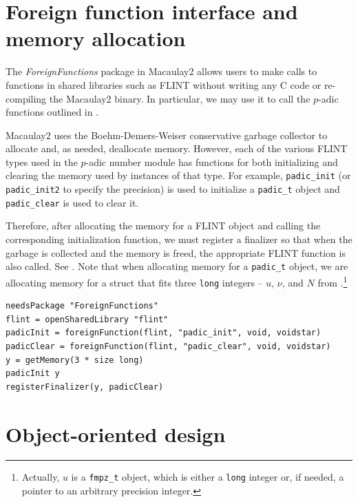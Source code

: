 \documentclass[runningheads]{llncs}
\begin{document}
\section{Foreign function interface and memory allocation}\label{ffi overview}

The \textit{ForeignFunctions} package in Macaulay2 \cite{foreign-functions} allows users to make calls to functions in shared libraries such as FLINT without writing any C code or re-compiling the Macaulay2 binary.  In particular, we may use it to call the $p$-adic functions outlined in .

Macaulay2 uses the Boehm-Demers-Weiser conservative garbage collector \cite{bdwgc} to allocate and, as needed, deallocate memory.  However, each of the various FLINT types used in the $p$-adic number module has functions for both initializing and clearing the memory used by instances of that type.  For example, \texttt{padic\_init} (or \texttt{padic\_init2} to specify the precision) is used to initialize a \texttt{padic\_t} object and \texttt{padic\_clear} is used to clear it.

Therefore, after allocating the memory for a FLINT object and calling the corresponding initialization function, we must register a finalizer so that when the garbage is collected and the memory is freed, the appropriate FLINT function is also called. See .  Note that when allocating memory for a \texttt{padic\_t} object, we are allocating memory for a struct that fits three \texttt{long} integers -- $u$, $\nu$, and $N$ from .\footnote{Actually, $u$ is a \texttt{fmpz\_t} object, which is either a \texttt{long} integer or, if needed, a pointer to an arbitrary precision integer.}

\begin{listing}[htbp!]
  \begin{verbatim}
needsPackage "ForeignFunctions"
flint = openSharedLibrary "flint"
padicInit = foreignFunction(flint, "padic_init", void, voidstar)
padicClear = foreignFunction(flint, "padic_clear", void, voidstar)
y = getMemory(3 * size long)
padicInit y
registerFinalizer(y, padicClear)
\end{verbatim}
\caption{Initializing a \texttt{padic\_t} object}
\label{garbage collection example}
\end{listing}

\section{Object-oriented design}\label{object-oriented design}
\end{document}
